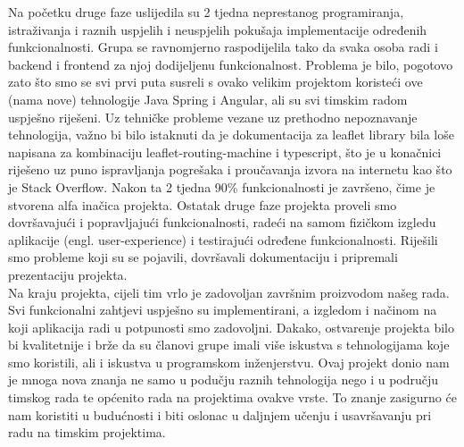 		 \textnormal{Na početku druge faze uslijedila su 2 tjedna neprestanog programiranja, istraživanja i raznih uspjelih i neuspjelih pokušaja implementacije određenih funkcionalnosti. Grupa se ravnomjerno raspodijelila tako da svaka osoba radi i backend i frontend za njoj dodijeljenu funkcionalnost. Problema je bilo, pogotovo zato što smo se svi prvi puta susreli s ovako velikim projektom koristeći ove (nama nove) tehnologije Java Spring i Angular, ali su svi timskim radom uspješno riješeni. Uz tehničke probleme vezane uz prethodno nepoznavanje tehnologija, važno bi bilo istaknuti da je dokumentacija za leaflet library bila loše napisana za kombinaciju leaflet-routing-machine i typescript, što je u konačnici riješeno uz puno ispravljanja pogrešaka i proučavanja izvora na internetu kao što je Stack Overflow. Nakon ta 2 tjedna 90\% funkcionalnosti je završeno, čime je stvorena alfa inačica projekta. Ostatak druge faze projekta proveli smo dovršavajući i popravljajući funkcionalnosti, radeći na samom fizičkom izgledu aplikacije (engl. user-experience) i testirajući određene funkcionalnosti. Riješili smo probleme koji su se pojavili, dovršavali dokumentaciju i pripremali prezentaciju projekta.}\\
		 
		 \textnormal{Na kraju projekta, cijeli tim vrlo je zadovoljan završnim proizvodom našeg rada. Svi funkcionalni zahtjevi uspješno su implementirani, a izgledom i načinom na koji aplikacija radi u potpunosti smo zadovoljni. Dakako, ostvarenje projekta bilo bi kvalitetnije i brže da su članovi grupe imali više iskustva s tehnologijama koje smo koristili, ali i iskustva u programskom inženjerstvu. Ovaj projekt donio nam je mnoga nova znanja ne samo u podučju raznih tehnologija nego i u području timskog rada te općenito rada na projektima ovakve vrste. To znanje zasigurno će nam koristiti u budućnosti i biti oslonac u daljnjem učenju i usavršavanju pri radu na timskim projektima.}\\
		
		\eject 
